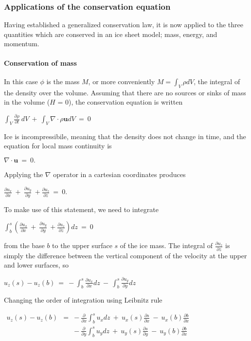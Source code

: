 \subsubsection{Applications of the conservation equation}

Having established a generalized conservation law, it is now applied to
the three quantities which are conserved in an ice sheet model; mass,
energy, and momentum.

\paragraph{Conservation of mass}

In this case $\phi$ is the mass $M$, or more conveniently
$M = \int_V \rho dV$, the integral of the density over the volume.
Assuming that there are no sources or sinks of mass in the volume ($H$ =
0), the conservation equation is written

$
\int_{V}\frac{\partial \rho} {\partial t} ~dV ~+~ \int_{V} \nabla \cdot \rho \mathbf{u} dV~=~0
$

Ice is incompressibile, meaning that the density does not change in
time, and the equation for local mass continuity is

$
\nabla \cdot \mathbf{u} ~=~0.
$

Applying the $\nabla$ operator in a cartesian coordinates produces

$
\frac{\partial u_{x}}{\partial x}~+~\frac{\partial u_{y}}{\partial y} ~+\frac{\partial u_{z}}{\partial z}~=~0.  
$

To make use of this statement, we need to integrate

$
\int_{b}^{s} \left( \frac{\partial u_{x}}{\partial x}~+~\frac{\partial u_{y}}{\partial y} ~+\frac{\partial u_{z}}{\partial z}\right) dz~=~0  
$

from the base $b$ to the upper surface $s$ of the ice mass. The integral
of $\frac{\partial u_z}{\partial z}$ is simply the difference between
the vertical component of the velocity at the upper and lower surfaces,
so

$
u_{z} \left(s\right)-u_{z} \left(b\right)~=~-\int_{b}^{s} \frac{\partial u_{x}}{\partial x} dz ~-~\int_{b}^{s} \frac{\partial u_{y}}{\partial y} dz  
$

Changing the order of integration using Leibnitz rule

$\begin{matrix}
u_{z} \left(s\right)-u_{z} \left(b\right) & = & -~\frac{\partial}{\partial x} \int_{b}^{s} u_{x} dz ~ +~u_{x}(s)\frac{\partial s}{\partial x} ~-~ u_{x}(b)\frac{\partial b}{\partial x}  \\ 
& & -~\frac{\partial}{\partial y}\int_{b}^{s} u_{y} dz   ~ +~u_{y}(s)\frac{\partial s}{\partial y} ~-~ u_{y}(b)\frac{\partial b}{\partial x}
\end{matrix}$

